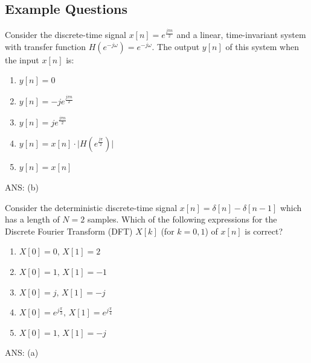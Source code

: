 \subsection{Example Questions}
\begin{q}{}
Consider the discrete-time signal $x[n] = e^{\frac{j\pi n}{2}}$ and a linear, time-invariant system with transfer function $H(e^{-j\omega}) = e^{-j \omega}$. The output $y[n]$ of this system when the input $x[n]$ is:

\begin{enumerate}[label=(\alph*)]
    \item $y[n] = 0$
    \item $y[n] = -je^{\frac{j\pi n}{2}}$
    \item $y[n] = je^{\frac{j\pi n}{2}}$
    \item $y[n] = x[n] \cdot \lvert H(e^{\frac{j \pi}{2}})\rvert$
    \item $y[n] = x[n]$
\end{enumerate}
\begin{flushright}
\begin{blueenv}
    ANS: (b)
\end{blueenv}
\end{flushright}
\end{q}
\begin{q}{}
Consider the deterministic discrete-time signal $x[n] = \delta[n] - \delta[n-1]$ which has a length of $N = 2$ samples. Which of the following expressions for the Discrete Fourier Transform (DFT) $X[k]$ (for $k = 0, 1$) of $x[n]$ is correct?

\begin{enumerate}[label=(\alph*)]
    \item $X[0] = 0, \, X[1] = 2$
    \item $X[0] = 1, \, X[1] = -1$
    \item $X[0] = j, \, X[1] = -j$
    \item $X[0] = e^{j\frac{\pi}{3}}, \, X[1] = e^{j\frac{\pi}{4}}$
    \item $X[0] = 1, \, X[1] = -j$
\end{enumerate}
\begin{flushright}
\begin{blueenv}
    ANS: (a)
\end{blueenv}
\end{flushright}
\end{q}
